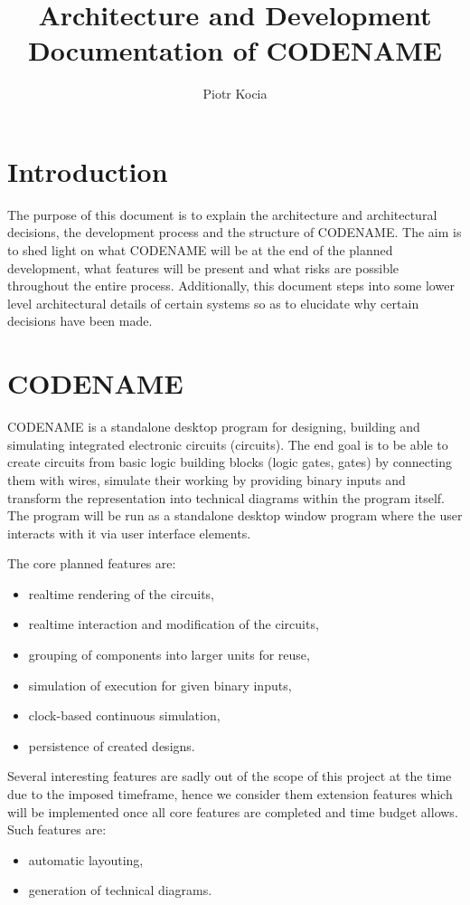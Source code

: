 \documentclass[12pt, a4paper]{article}
\title{Architecture and Development Documentation of CODENAME}
\author{Piotr Kocia}
\date{}
\newenvironment{itemlist}
{\begin{itemize}
  \setlength{\itemsep}{0pt}}
{\end{itemize}}
\begin{document}
\maketitle

\tableofcontents

\section{Introduction}
The purpose of this document is to explain the architecture and architectural decisions, the
development process and the structure of CODENAME. The aim is to shed light on what CODENAME will be
at the end of the planned development, what features will be present and what risks are possible
throughout the entire process. Additionally, this document steps into some lower level architectural
details of certain systems so as to elucidate why certain decisions have been made.

\section{CODENAME}
CODENAME is a standalone desktop program for designing, building and simulating integrated
electronic circuits (circuits). The end goal is to be able to create circuits from basic logic
building blocks (logic gates, gates) by connecting them with wires, simulate their working by
providing binary inputs and transform the representation into technical diagrams within the program
itself. The program will be run as a standalone desktop window program where the user interacts with
it via user interface elements.

The core planned features are:
\begin{itemlist}
\item realtime rendering of the circuits,
\item realtime interaction and modification of the circuits,
\item grouping of components into larger units for reuse,
\item simulation of execution for given binary inputs,
\item clock-based continuous simulation,
\item persistence of created designs.
\end{itemlist}

Several interesting features are sadly out of the scope of this project at the time due to the
imposed timeframe, hence we consider them extension features which will be implemented once all core
features are completed and time budget allows. Such features are:
\begin{itemlist}
\item automatic layouting,
\item generation of technical diagrams.
\end{itemlist}
\end{document}
